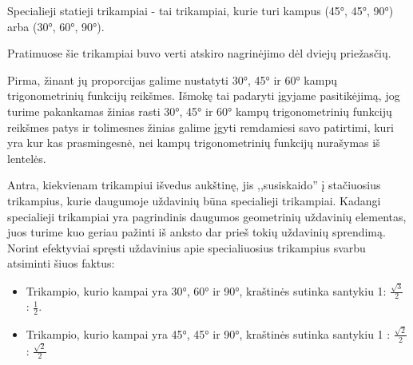 \documentclass[a4paper]{article}
\begin{document}
\begin{mdframed}[backgroundcolor=yellow!50!white]
Specialieji statieji trikampiai - tai trikampiai, kurie turi kampus (45°, 45°, 90°) arba (30°, 60°, 90°). 
\end{mdframed}

Pratimuose šie trikampiai buvo verti atskiro nagrinėjimo dėl dviejų priežasčių. 

Pirma, žinant jų proporcijas galime nustatyti 30°, 45° ir 60° kampų trigonometrinių funkcijų reikšmes. Išmokę tai padaryti įgyjame pasitikėjimą, jog turime pakankamas žinias rasti 30°, 45° ir 60° kampų trigonometrinių funkcijų reikšmes patys ir tolimesnes žinias galime įgyti remdamiesi savo patirtimi, kuri yra kur kas prasmingesnė, nei kampų trigonometrinių funkcijų nurašymas iš lentelės.

Antra, kiekvienam trikampiui išvedus aukštinę, jis ,,susiskaido'' į stačiuosius trikampius, kurie daugumoje uždavinių būna specialieji trikampiai. Kadangi specialieji trikampiai yra pagrindinis daugumos geometrinių uždavinių elementas, juos turime kuo geriau pažinti iš anksto dar prieš tokių uždavinių sprendimą. Norint efektyviai spręsti uždavinius apie specialiuosius trikampius svarbu atsiminti šiuos faktus:

\begin{mdframed}[backgroundcolor=yellow!50!white]
\begin{itemize}
\item Trikampio, kurio kampai yra 30°, 60° ir 90°, kraštinės sutinka santykiu 1: $\frac{\sqrt{3}}{2}$ : $\frac{1}{2}$.
\item Trikampio, kurio kampai yra 45°, 45° ir 90°, kraštinės sutinka santykiu 1 : $\frac{\sqrt{2}}{2}$ : $\frac{\sqrt{2}}{2}$
\end{itemize}
\end{mdframed}
\end{document}
